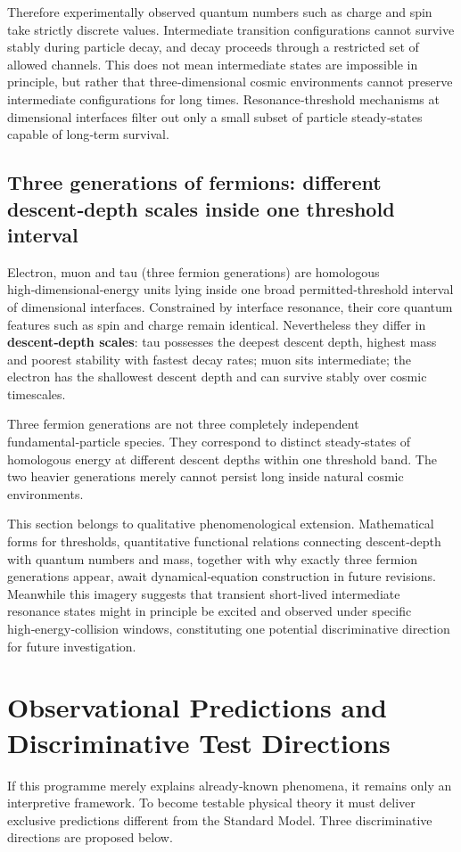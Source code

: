 \documentclass[12pt,a4paper]{article}
\begin{document}
Therefore experimentally observed quantum numbers such as charge and spin take strictly discrete values. Intermediate transition configurations cannot survive stably during particle decay, and decay proceeds through a restricted set of allowed channels. This does not mean intermediate states are impossible in principle, but rather that three‑dimensional cosmic environments cannot preserve intermediate configurations for long times. Resonance‑threshold mechanisms at dimensional interfaces filter out only a small subset of particle steady‑states capable of long‑term survival.

\subsection{Three generations of fermions: different descent‑depth scales inside one threshold interval}
Electron, muon and tau (three fermion generations) are homologous high‑dimensional‑energy units lying inside one broad permitted‑threshold interval of dimensional interfaces. Constrained by interface resonance, their core quantum features such as spin and charge remain identical. Nevertheless they differ in \textbf{descent‑depth scales}: tau possesses the deepest descent depth, highest mass and poorest stability with fastest decay rates; muon sits intermediate; the electron has the shallowest descent depth and can survive stably over cosmic timescales.

Three fermion generations are not three completely independent fundamental‑particle species. They correspond to distinct steady‑states of homologous energy at different descent depths within one threshold band. The two heavier generations merely cannot persist long inside natural cosmic environments.

This section belongs to qualitative phenomenological extension. Mathematical forms for thresholds, quantitative functional relations connecting descent‑depth with quantum numbers and mass, together with why exactly three fermion generations appear, await dynamical‑equation construction in future revisions. Meanwhile this imagery suggests that transient short‑lived intermediate resonance states might in principle be excited and observed under specific high‑energy‑collision windows, constituting one potential discriminative direction for future investigation.

\section{Observational Predictions and Discriminative Test Directions}
If this programme merely explains already‑known phenomena, it remains only an interpretive framework. To become testable physical theory it must deliver exclusive predictions different from the Standard Model. Three discriminative directions are proposed below.
\end{document}
